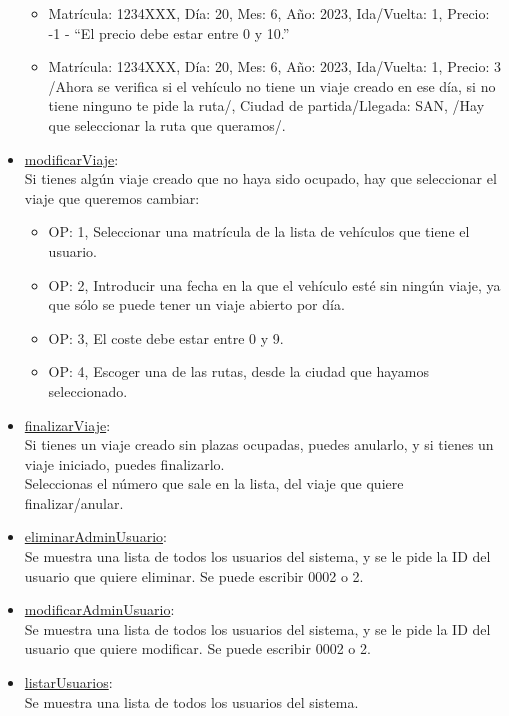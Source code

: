 \begin{itemize}
\begin{itemize}
    \item Matrícula: 1234XXX, Día: 20, Mes: 6, Año: 2023, Ida/Vuelta: 1, Precio: -1 - “El precio debe estar entre 0 y 10.”
    \item Matrícula: 1234XXX, Día: 20, Mes: 6, Año: 2023, Ida/Vuelta: 1, Precio: 3 /Ahora se verifica si el vehículo no tiene un viaje creado en ese día,
    si no tiene ninguno te pide la ruta/, Ciudad de partida/Llegada: SAN, /Hay que seleccionar la ruta que queramos/.
  \end{itemize}
  \item \href{DOC_DOXYGEN/modificar_8c_source.html}{modificarViaje}:\\
  Si tienes algún viaje creado que no haya sido ocupado, hay que seleccionar el viaje que queremos cambiar:
  \begin{itemize}
    \item OP: 1, Seleccionar una matrícula de la lista de vehículos que tiene el usuario. 
    \item OP: 2, Introducir una fecha en la que el vehículo esté sin ningún viaje, ya que sólo se puede tener un viaje abierto por día. 
    \item OP: 3, El coste debe estar entre 0 y 9.
    \item OP: 4, Escoger una de las rutas, desde la ciudad que hayamos seleccionado.
  \end{itemize}
  \item \href{DOC_DOXYGEN/eliminar_8c_source.html}{finalizarViaje}:\\
  Si tienes un viaje creado sin plazas ocupadas, puedes anularlo, y si tienes un viaje iniciado, puedes finalizarlo.\\
  Seleccionas el número que sale en la lista, del viaje que quiere finalizar/anular.

  \item \href{DOC_DOXYGEN/eliminar_8c_source.html}{eliminarAdminUsuario}:\\
  Se muestra una lista de todos los usuarios del sistema, y se le pide la ID del usuario que quiere eliminar. Se puede escribir 0002 o 2.

  \item \href{DOC_DOXYGEN/modificar_8c_source.html}{modificarAdminUsuario}:\\
  Se muestra una lista de todos los usuarios del sistema, y se le pide la ID del usuario que quiere modificar. Se puede escribir 0002 o 2.

  \item \href{DOC_DOXYGEN/listar_8c_source.html}{listarUsuarios}:\\
  Se muestra una lista de todos los usuarios del sistema.


\end{itemize}
